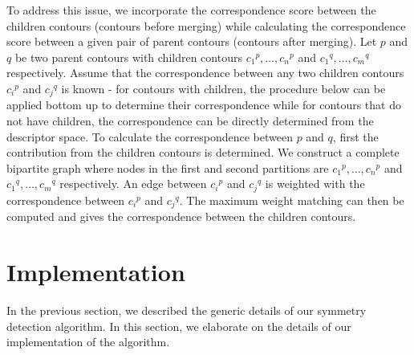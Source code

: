 \documentclass[review,journal]{vgtc}         %
\begin{document}
To address this issue, we incorporate the correspondence score between the children contours 
(contours before merging) while calculating the correspondence score between a given pair
of parent contours (contours after merging). Let $p$ and $q$ be two parent contours
with children contours ${c_1}^p,\dots,{c_n}^p$ and ${c_1}^q,\dots,{c_m}^q$ respectively. 
Assume that the correspondence between any two
children contours ${c_i}^p$ and ${c_j}^q$ is known - for contours with children,
the procedure below can be applied bottom up to determine their correspondence
while for contours that do not have children, the correspondence can be directly 
determined from the descriptor space. To calculate the correspondence 
between $p$ and $q$, first the contribution from the children contours 
is determined. We construct a complete bipartite graph where nodes in the first
and second partitions are ${c_1}^p,\dots,{c_n}^p$ and ${c_1}^q,\dots,{c_m}^q$ 
respectively. An edge between ${c_i}^p$ and ${c_j}^q$ is weighted
with the correspondence between ${c_i}^p$ and ${c_j}^q$. The maximum weight
matching can then be computed and gives the correspondence between the children
contours.
\section{Implementation}
In the previous section, we described the generic details of our symmetry
detection algorithm. In this section, we elaborate on the details of our 
implementation of the algorithm.
\end{document}
